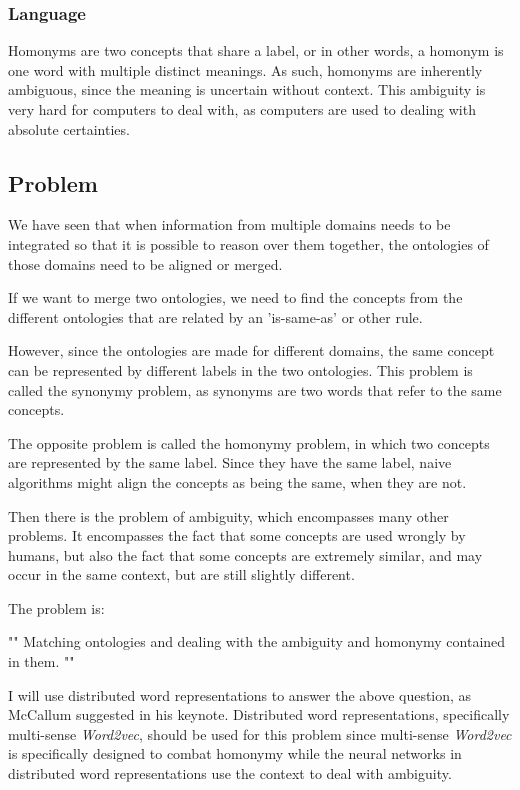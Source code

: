 \documentclass{article}
\begin{document}
  \subsubsection{Language}
  Homonyms are two concepts that share a label, or in other words, a homonym is one word with multiple distinct meanings. As such, homonyms are inherently ambiguous, since the meaning is uncertain without context. This ambiguity is very hard for computers to deal with, as computers are used to dealing with absolute certainties.
  
 \subsection{Problem}
 We have seen that when information from multiple domains needs to be integrated so that it is possible to reason over them together, the ontologies of those domains need to be aligned or merged.
 
 If we want to merge two ontologies, we need to find the concepts from the different ontologies that are related by an 'is-same-as' or other rule.
 
 However, since the ontologies are made for different domains, the same concept can be represented by different labels in the two ontologies. This problem is called the synonymy problem, as synonyms are two words that refer to the same concepts.
 
 The opposite problem is called the homonymy problem, in which two concepts are represented by the same label. Since they have the same label, naive algorithms might align the concepts as being the same, when they are not.
 
 Then there is the problem of ambiguity, which encompasses many other problems. It encompasses the fact that some concepts are used wrongly by humans, but also the fact that some concepts are extremely similar, and may occur in the same context, but are still slightly different.
 
 The problem is:
 
"" 
  Matching ontologies and dealing with the ambiguity and homonymy contained in them.
""

  I will use distributed word representations to answer the above question, as McCallum suggested in his keynote. Distributed word representations, specifically multi-sense \emph{Word2vec}, should be used for this problem since multi-sense \emph{Word2vec} is specifically designed to combat homonymy while the neural networks in distributed word representations use the context to deal with ambiguity.
  
\end{document}
